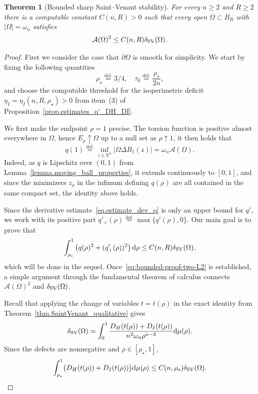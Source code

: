 \documentclass[11pt]{amsart}
\newcommand{\theoname}{Theorem}
\theoremstyle{plain}
\newtheorem{theorem}{\theoname}[section]
\theoremstyle{definition}
\newcommand{\eqdef}{\overset{\text{def.}}{=}}
\def\dd{{\rm d}}
\newcommand\SV{\mathop{\rm SV}}
\begin{document}
\begin{theorem}[Bounded sharp Saint--Venant stability]
\label{thm:boundedSV}
For every $n\ge 2$ and $R\ge 2$ there is a computable constant $C(n,R)>0$ such that every
open $\Omega\subset B_R$ with $|\Omega|=\omega_n$ satisfies
\begin{equation}\label{eq:boundedSV}
   \mathcal{A}(\Omega)^2\le C(n,R) \delta_{\SV}(\Omega).
\end{equation}
\end{theorem}
\begin{proof}
First we consider the case that $\partial \Omega$ is smooth for simplicity. We start by fixing the following quantities
\[
  \rho_\star \eqdef 3/4,
  \quad
  \tau_0 \eqdef \frac{\rho_\star}{2n},
\]
and choose the computable threshold for the isoperimetric deficit $\eta_I=\eta_I(n,R,\rho_\star)>0$ from item~(3) of Proposition~\ref{prop.estimates_q'_DH_DI}.

We first make the endpoint $\rho=1$ precise.  The torsion function is
positive almost everywhere in $\Omega$, hence
$E_\rho\uparrow\Omega$ up to a null set as $\rho\uparrow 1$, it then holds that
\[
 q(1) \eqdef \inf_{z\in\mathbb{R}^n}|\Omega\Delta B_1(z)| = \omega_n\mathcal{A}(\Omega).
\]
Indeed, as $q$ is Lipschitz over $(0,1)$ from Lemma~\ref{lemma.moving_ball_properties}, it extends continuously to $[0,1]$, and since the minimizers $z_\rho$ in the infimum defining $q(\rho)$ are all contained in the same compact set, the identity above holds.


Since the derivative estimate~\eqref{eq.estimate_dev_q} is only an upper
bound for $q'$, we work with its positive part
$q'_+(\rho)\eqdef\max\{q'(\rho),0\}$.  Our main goal is to prove that
\begin{equation}\label{eq:bounded-proof-two-L2}
 \int_{\rho_\star}^1
 \left(q(\rho)^2+(q'_+(\rho))^2\right)\dd\rho
 \le C(n,R)\delta_{\SV}(\Omega),
\end{equation}
which will be done in the sequel. Once~\eqref{eq:bounded-proof-two-L2} is established, a simple argument through the fundamental theorem of calculus connects $\mathcal{A}(\Omega)^2$ and $\delta_{\rm SV}(\Omega)$.

Recall that applying the change of variables $t=t(\rho)$ in the exact identity from
Theorem~\ref{thm.SaintVenant_qualitative} gives
\[
 \delta_{\SV}(\Omega)=
 \int_0^1\frac{D_H(t(\rho))+D_I(t(\rho))}{n^2\omega_n\rho^{n-2}}\dd\mu(\rho).
\]
Since the defects are nonnegative and $\rho\in[\rho_\star,1]$,
\begin{equation}\label{eq:bounded-proof-budget}
 \int_{\rho_\star}^{1}
 \bigl(D_H(t(\rho))+D_I(t(\rho))\bigr)\dd\mu(\rho)
 \le C(n,\rho_\star)\delta_{\SV}(\Omega).
\end{equation}


\end{proof}
\end{document}
